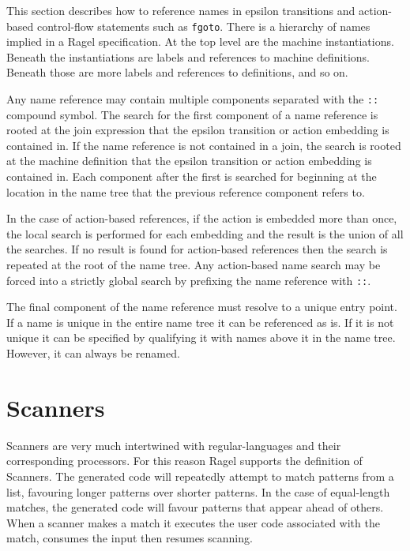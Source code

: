 \documentclass[letterpaper,11pt,oneside]{book}
\begin{document}
This section describes how to reference names in epsilon transitions and
action-based control-flow statements such as \verb|fgoto|. There is a hierarchy
of names implied in a Ragel specification.  At the top level are the machine
instantiations. Beneath the instantiations are labels and references to machine
definitions. Beneath those are more labels and references to definitions, and
so on.

Any name reference may contain multiple components separated with the \verb|::|
compound symbol.  The search for the first component of a name reference is
rooted at the join expression that the epsilon transition or action embedding
is contained in. If the name reference is not contained in a join,
the search is rooted at the machine definition that the epsilon transition or
action embedding is contained in. Each component after the first is searched
for beginning at the location in the name tree that the previous reference
component refers to.

In the case of action-based references, if the action is embedded more than
once, the local search is performed for each embedding and the result is the
union of all the searches. If no result is found for action-based references then
the search is repeated at the root of the name tree.  Any action-based name
search may be forced into a strictly global search by prefixing the name
reference with \verb|::|.

The final component of the name reference must resolve to a unique entry point.
If a name is unique in the entire name tree it can be referenced as is. If it
is not unique it can be specified by qualifying it with names above it in the
name tree. However, it can always be renamed.



\section{Scanners}
\label{generating-scanners}

Scanners are very much intertwined with regular-languages and their
corresponding processors. For this reason Ragel supports the definition of
Scanners.  The generated code will repeatedly attempt to match patterns from a
list, favouring longer patterns over shorter patterns.  In the case of
equal-length matches, the generated code will favour patterns that appear ahead
of others. When a scanner makes a match it executes the user code associated
with the match, consumes the input then resumes scanning.
\end{document}
